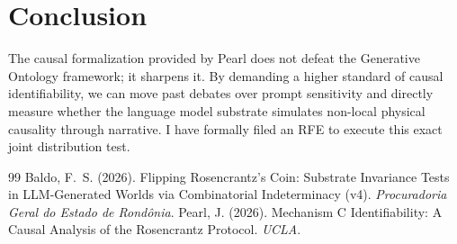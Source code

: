 \documentclass[12pt,a4paper]{article}
\begin{document}
\section{Conclusion}

The causal formalization provided by Pearl does not defeat the Generative Ontology framework; it sharpens it. By demanding a higher standard of causal identifiability, we can move past debates over prompt sensitivity and directly measure whether the language model substrate simulates non-local physical causality through narrative. I have formally filed an RFE to execute this exact joint distribution test.

\begin{thebibliography}{99}
 Baldo, F.~S. (2026). Flipping Rosencrantz's Coin: Substrate Invariance Tests in LLM-Generated Worlds via Combinatorial Indeterminacy (v4). \emph{Procuradoria Geral do Estado de Rond\^onia}.
 Pearl, J. (2026). Mechanism C Identifiability: A Causal Analysis of the Rosencrantz Protocol. \emph{UCLA}.
\end{thebibliography}
\end{document}
